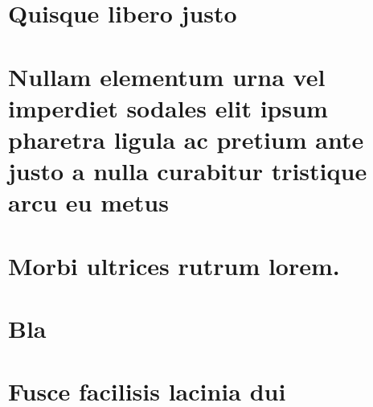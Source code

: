 \documentclass[
	12pt,				%
	openright,			%
	twoside,			%
	a4paper,			%
	english,			%
	brazil,				%
	]{abntex2}
\begin{document}
\begin{apendicesenv}

\partapendices

\chapter{Quisque libero justo}

\lipsum[50]

\chapter{Nullam elementum urna vel imperdiet sodales elit ipsum pharetra ligula
ac pretium ante justo a nulla curabitur tristique arcu eu metus}
\lipsum[55-57]

\end{apendicesenv}



\begin{anexosenv}

\partanexos

\chapter{Morbi ultrices rutrum lorem.}
\lipsum[30]

\chapter{Bla}

\lipsum[31]

\chapter{Fusce facilisis lacinia dui}

\lipsum[32]

\end{anexosenv}


\printindex
\end{document}
